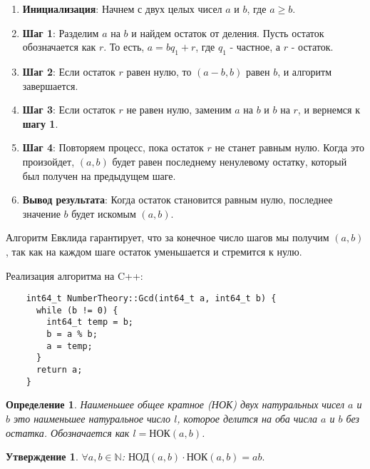 \documentclass[12pt, a4paper, openany]{book}
\newtheorem*{definition}{Определение}
\newtheorem*{statement}{Утверждение}
\begin{document}
\begin{enumerate}
  \item \textbf{Инициализация}: Начнем с двух целых чисел $a$ и $b$, где $a \geq b$.
  
  \item \textbf{Шаг 1}: Разделим $a$ на $b$ и найдем остаток от деления. Пусть остаток обозначается как $r$. То есть, $a = bq_1 + r$, где $q_1$ - частное, а $r$ - остаток.
  
  \item \textbf{Шаг 2}: Если остаток $r$ равен нулю, то $(a-b, b)$ равен $b$, и алгоритм завершается.
  
  \item \textbf{Шаг 3}: Если остаток $r$ не равен нулю, заменим $a$ на $b$ и $b$ на $r$, и вернемся к \textbf{шагу 1}.
  
  \item \textbf{Шаг 4}: Повторяем процесс, пока остаток $r$ не станет равным нулю. Когда это произойдет, $(a, b)$ будет равен последнему ненулевому остатку, который был получен на предыдущем шаге.
  
  \item \textbf{Вывод результата}: Когда остаток становится равным нулю, последнее значение $b$ будет искомым $(a, b)$.
\end{enumerate}

    Алгоритм Евклида гарантирует, что за конечное число шагов мы получим $(a, b)$, так как на каждом шаге остаток уменьшается и стремится к нулю.

\newpage

\noindent
    Реализация алгоритма на C++:

\begin{lstlisting}
    int64_t NumberTheory::Gcd(int64_t a, int64_t b) {
      while (b != 0) {
        int64_t temp = b;
        b = a % b;
        a = temp;
      }
      return a;
    }
\end{lstlisting}

\begin{definition}
    Наименьшее общее кратное (НОК) двух натуральных чисел \(a\) и \(b\) это наименьшее натуральное число \(l\), которое делится на оба числа \(a\) и \(b\) без остатка. Обозначается как \(l = \text{НОК}(a, b)\).
\end{definition}

\begin{statement}
    $\forall a, b \in \mathbb{N}$:
    $\text{НОД}(a, b) \cdot \text{НОК}(a, b) = ab.$
\end{statement}
\end{document}
